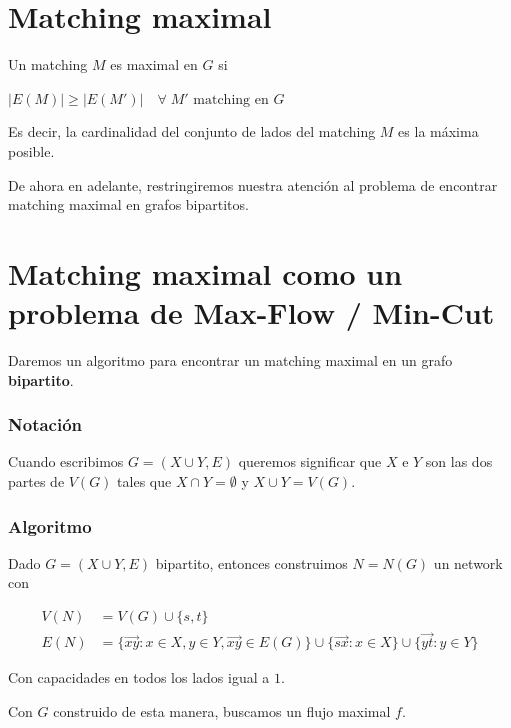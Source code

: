 \documentclass[10pt,a4paper]{article}
\begin{document}
\section*{Matching maximal}

Un matching $M$ es maximal en $G$ si

\begin{center}
$\lvert E(M)\rvert \geq \lvert E(M')\rvert\quad \forall\; M'\text{ matching en } G$
\end{center}

Es decir, la cardinalidad del conjunto de lados del matching $M$ es la máxima posible.

De ahora en adelante, restringiremos nuestra atención al problema de encontrar matching maximal en grafos bipartitos.

\section*{Matching maximal como un problema de Max-Flow / Min-Cut}

Daremos un algoritmo para encontrar un matching maximal en un grafo \textbf{bipartito}.

\subsubsection*{Notación}

Cuando escribimos $G = (X \cup Y, E)$ queremos significar que $X$ e $Y$ son las dos partes de $V(G)$ tales que $X\cap Y = \emptyset$ y $X \cup Y = V(G)$.

\subsubsection*{Algoritmo}

Dado $G = (X \cup Y, E)$ bipartito, entonces construimos $N = N(G) $ un network con

\begin{center}
\begin{align*} V(N) &= V(G) \cup \{s, t\}\\ E(N) &= \{\overrightarrow{xy}: x\in X, y \in Y, \overrightarrow{xy} \in E(G)\} \cup \{\overrightarrow{sx}:x\in X\} \cup \{\overrightarrow{yt}:y\in Y\} \end{align*}
\end{center}

Con capacidades en todos los lados igual a $1$.

Con $G$ construido de esta manera, buscamos un flujo maximal $f$.
\end{document}
